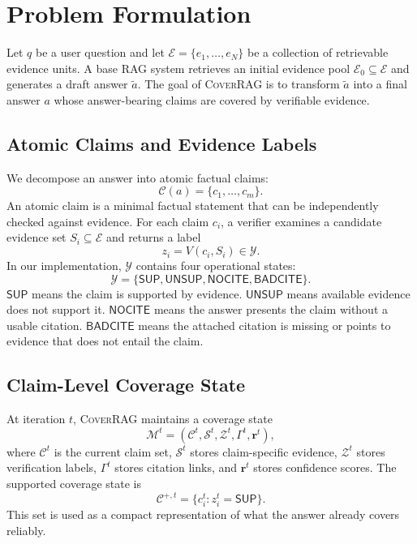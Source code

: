 \section{Problem Formulation}
\label{sec:problem_formulation}

Let $q$ be a user question and let $\mathcal{E}=\{e_1,\ldots,e_N\}$ be a collection of retrievable evidence units. A base RAG system retrieves an initial evidence pool $\mathcal{E}_0 \subseteq \mathcal{E}$ and generates a draft answer $\tilde{a}$. The goal of \textsc{CoverRAG} is to transform $\tilde{a}$ into a final answer $a$ whose answer-bearing claims are covered by verifiable evidence.

\subsection{Atomic Claims and Evidence Labels}

We decompose an answer into atomic factual claims:
\begin{equation}
    \mathcal{C}(a)=\{c_1,\ldots,c_m\}.
\end{equation}
An atomic claim is a minimal factual statement that can be independently checked against evidence. For each claim $c_i$, a verifier examines a candidate evidence set $S_i \subseteq \mathcal{E}$ and returns a label
\begin{equation}
    z_i = V(c_i,S_i) \in \mathcal{Y}.
\end{equation}
In our implementation, $\mathcal{Y}$ contains four operational states:
\begin{equation}
    \mathcal{Y}=\{\mathsf{SUP},\mathsf{UNSUP},\mathsf{NOCITE},\mathsf{BADCITE}\}.
\end{equation}
$\mathsf{SUP}$ means the claim is supported by evidence. $\mathsf{UNSUP}$ means available evidence does not support it. $\mathsf{NOCITE}$ means the answer presents the claim without a usable citation. $\mathsf{BADCITE}$ means the attached citation is missing or points to evidence that does not entail the claim.

\subsection{Claim-Level Coverage State}

At iteration $t$, \textsc{CoverRAG} maintains a coverage state
\begin{equation}
    \mathcal{M}^{t}=(\mathcal{C}^{t},\mathcal{S}^{t},\mathcal{Z}^{t},\Gamma^{t},\mathbf{r}^{t}),
\end{equation}
where $\mathcal{C}^{t}$ is the current claim set, $\mathcal{S}^{t}$ stores claim-specific evidence, $\mathcal{Z}^{t}$ stores verification labels, $\Gamma^{t}$ stores citation links, and $\mathbf{r}^{t}$ stores confidence scores. The supported coverage state is
\begin{equation}
    \mathcal{C}^{+,t}=\{c_i^t:z_i^t=\mathsf{SUP}\}.
\end{equation}
This set is used as a compact representation of what the answer already covers reliably.


